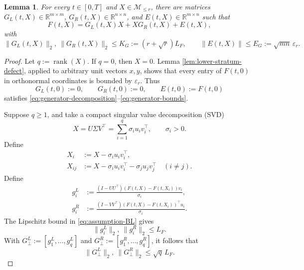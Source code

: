 \documentclass[10pt,a4paper]{amsart}
\newtheorem{lemma}{Lemma}
\newcommand{\Mle}{\mathcal{M}_{\le r}}
\newcommand{\R}{\mathbb{R}}
\newcommand{\eps}{\varepsilon}
\newcommand{\rank}{\operatorname{rank}}
\begin{document}
\begin{lemma}
\label{lem:bounded-generators}
For every \(t\in[0,T]\) and \(X\in\Mle\), there are matrices
\(G_L(t,X)\in\R^{m\times m}\), \(G_R(t,X)\in\R^{n\times n}\), and
\(E(t,X)\in\R^{m\times n}\) such that
\begin{equation}\label{eq:generator-decomposition}
 F(t,X)=G_L(t,X)X+XG_R(t,X)+E(t,X),
\end{equation}
with
\begin{equation}\label{eq:generator-bounds}
 \|G_L(t,X)\|_2,\ \|G_R(t,X)\|_2
 \le K_G:=(r+\sqrt r)L_F,
 \qquad
 \|E(t,X)\|\le E_G:=\sqrt{mn}\,\eps_r.
\end{equation}
\end{lemma}

\begin{proof}
Let \(q:=\rank(X)\).  If \(q=0\), then \(X=0\).  Lemma
\ref{lem:lower-stratum-defect}, applied to arbitrary unit vectors \(x,y\),
shows that every entry of \(F(t,0)\) in orthonormal coordinates is bounded
by \(\eps_r\).  Thus
\begin{equation}\label{eq:zero-generator-case}
 G_L(t,0):=0,\qquad G_R(t,0):=0,\qquad E(t,0):=F(t,0)
\end{equation}
satisfies \eqref{eq:generator-decomposition}--\eqref{eq:generator-bounds}.

Suppose \(q\ge1\), and take a compact singular value decomposition (SVD)
\begin{equation}\label{eq:generator-svd}
 X=U\Sigma V^\top
  =\sum_{i=1}^q\sigma_i u_i v_i^\top,
 \qquad \sigma_i>0.
\end{equation}
Define
\begin{align}
 X_i&:=X-\sigma_i u_i v_i^\top,                       \label{eq:delete-one}\\
 X_{ij}&:=X-\sigma_i u_i v_i^\top-\sigma_j u_j v_j^\top
 \quad(i\ne j).                                      \label{eq:delete-two}
\end{align}
Define
\begin{align}
 g_i^L&:=\frac{(I-UU^\top)(F(t,X)-F(t,X_i))v_i}{\sigma_i},
                                                               \label{eq:left-generator-column}\\
 g_i^R&:=\frac{(I-VV^\top)(F(t,X)-F(t,X_i))^\top u_i}{\sigma_i}.
                                                               \label{eq:right-generator-column}
\end{align}
The Lipschitz bound in \eqref{eq:assumption-BL} gives
\begin{equation}\label{eq:normal-generator-bounds}
 \|g_i^L\|_2,\ \|g_i^R\|_2\le L_F.
\end{equation}
With
\(G_\perp^L:=[g_1^L,\ldots,g_q^L]\) and
\(G_\perp^R:=[g_1^R,\ldots,g_q^R]\), it follows that
\begin{equation}\label{eq:normal-generator-matrix-bounds}
 \|G_\perp^L\|_2,\ \|G_\perp^R\|_2\le\sqrt q\,L_F.
\end{equation}


\end{proof}
\end{document}
